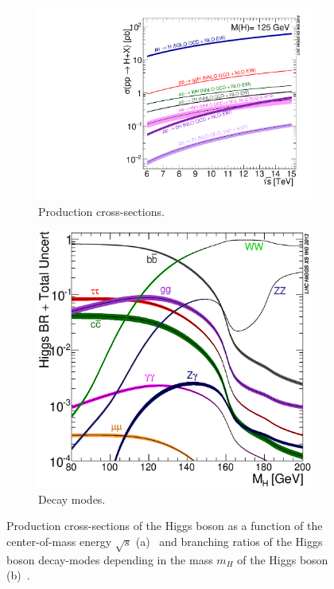 \begin{figure}[htb]
    \centering
    \begin{subfigure}[t]{0.45\textwidth}
        \includegraphics[width=\textwidth]{./figures/theory/higgs_xsec_production.pdf}
        \caption{Production cross-sections.}\label{fig:theory:higgs:xsecs}
    \end{subfigure}
    \begin{subfigure}[t]{0.45\textwidth}
        \includegraphics[width=\textwidth]{./figures/theory/higgs_xsec_decay.eps}
        \caption{Decay modes.}\label{fig:theory:higgs:br}
    \end{subfigure}
    \caption{Production cross-sections of the Higgs boson as a function of the center-of-mass energy $\sqrt{s}$ (a)~\cite{YR4}
             and branching ratios of the Higgs boson decay-modes depending in the mass $m_H$ of the Higgs boson (b)~\cite{YR3}.}
\end{figure}

